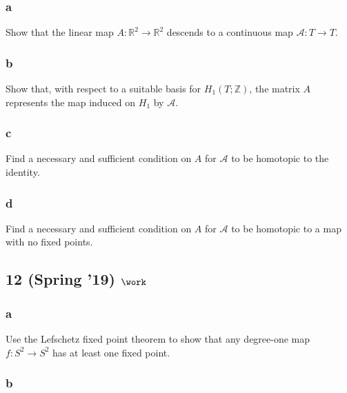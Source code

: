 \hypertarget{a-26}{%
\subsubsection{a}\label{a-26}}

Show that the linear map \(A : {\mathbb{R}}^2 \to {\mathbb{R}}^2\)
descends to a continuous map \({\mathcal{A}}: T \to T\).

\hypertarget{b-26}{%
\subsubsection{b}\label{b-26}}

Show that, with respect to a suitable basis for
\(H_1 (T ; {\mathbb{Z}})\), the matrix \(A\) represents the map induced
on \(H_1\) by \({\mathcal{A}}\).

\hypertarget{c-8}{%
\subsubsection{c}\label{c-8}}

Find a necessary and sufficient condition on \(A\) for \({\mathcal{A}}\)
to be homotopic to the identity.

\hypertarget{d-1}{%
\subsubsection{d}\label{d-1}}

Find a necessary and sufficient condition on \(A\) for \({\mathcal{A}}\)
to be homotopic to a map with no fixed points.

\hypertarget{spring-19-work-3}{%
\subsection{\texorpdfstring{12 (Spring '19)
\(\work\)}{12 (Spring '19) \textbackslash work}}\label{spring-19-work-3}}

\hypertarget{a-27}{%
\subsubsection{a}\label{a-27}}

Use the Lefschetz fixed point theorem to show that any degree-one map
\(f : S^2 \to S^2\) has at least one fixed point.

\hypertarget{b-27}{%
\subsubsection{b}\label{b-27}}

